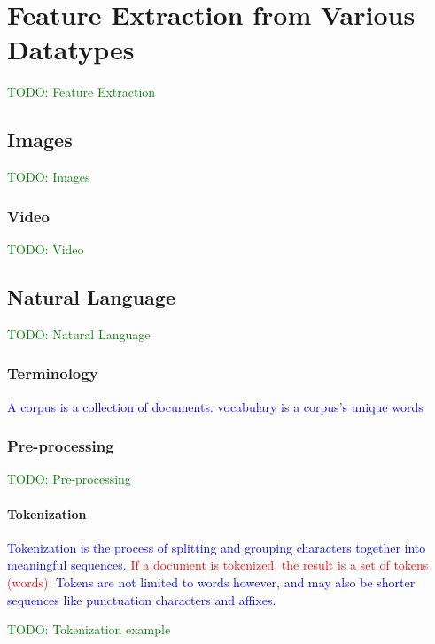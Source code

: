 \section{Feature Extraction from Various Datatypes}

\textcolor{green}{TODO: Feature Extraction}


\subsection{Images}

\textcolor{green}{TODO: Images}


\subsubsection{Video}

\textcolor{green}{TODO: Video}


\subsection{Natural Language}

\textcolor{green}{TODO: Natural Language}

\subsubsection{Terminology}

\textcolor{blue}{A {corpus} is a collection of documents. {vocabulary} is a corpus's unique words}

\subsubsection{Pre-processing}

\textcolor{green}{TODO: Pre-processing}

\paragraph{Tokenization}

\textcolor{blue}{Tokenization is the process of splitting and grouping characters together into meaningful sequences. \textcolor{red}{If a document is tokenized, the result is a set of tokens (words).} Tokens are not limited to words however, and may also be shorter sequences like punctuation characters and affixes.}

\textcolor{green}{TODO: Tokenization example}

